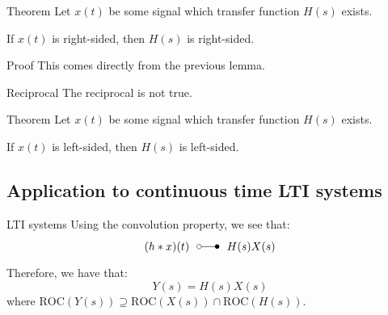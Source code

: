 \documentclass[a4paper]{article}
\begin{document}
\begin{parag}{Theorem}
    Let $x\left(t\right)$ be some signal which transfer function $H\left(s\right)$ exists.

    If $x\left(t\right)$ is right-sided, then $H\left(s\right)$ is right-sided. 

    \begin{subparag}{Proof}
        This comes directly from the previous lemma.
    \end{subparag}
    
    \begin{subparag}{Reciprocal}
        The reciprocal is not true.
    \end{subparag}
\end{parag}

\begin{parag}{Theorem}
    Let $x\left(t\right)$ be some signal which transfer function $H\left(s\right)$ exists.

    If $x\left(t\right)$ is left-sided, then $H\left(s\right)$ is left-sided. 
\end{parag}

\subsection{Application to continuous time LTI systems}
\begin{parag}{LTI systems}
    Using the convolution property, we see that: 
    \[\left(h* x\right)\left(t\right) \laplacepair H\left(s\right)X\left(s\right)\]

    Therefore, we have that: 
    \[Y\left(s\right) = H\left(s\right) X\left(s\right)\]
    where $\text{ROC}\left(Y\left(s\right)\right) \supseteq \text{ROC}\left(X\left(s\right)\right) \cap \text{ROC}\left(H\left(s\right)\right)$.
\end{parag}
\end{document}
